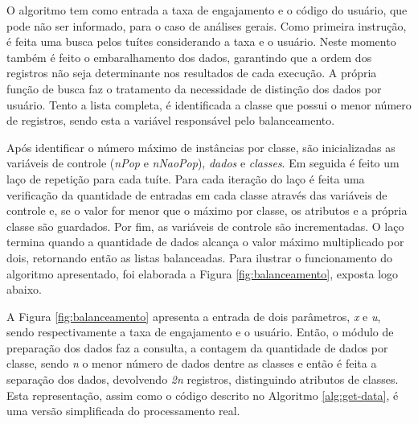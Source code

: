 \documentclass[oneside,openright,12pt]{ufsm_2015} %
\begin{document}
    \par O algoritmo tem como entrada a taxa de engajamento e o código do usuário, que pode não ser informado, para o caso de análises gerais. Como primeira instrução, é feita uma busca pelos tuítes considerando a taxa e o usuário. Neste momento também é feito o embaralhamento dos dados, garantindo que a ordem dos registros não seja determinante nos resultados de cada execução. A própria função de busca faz o tratamento da necessidade de distinção dos dados por usuário. Tento a lista completa, é identificada a classe que possui o menor número de registros, sendo esta a variável responsável pelo balanceamento. 
    
    \par Após identificar o número máximo de instâncias por classe, são inicializadas as variáveis de controle (\textit{nPop} e \textit{nNaoPop}), \textit{dados} e \textit{classes}. Em seguida é feito um laço de repetição para cada tuíte. Para cada iteração do laço é feita uma verificação da quantidade de entradas em cada classe através das variáveis de controle e, se o valor for menor que o máximo por classe, os atributos e a própria classe são guardados. Por fim, as variáveis de controle são incrementadas. O laço termina quando a quantidade de dados alcança o valor máximo multiplicado por dois, retornando então as listas balanceadas. Para ilustrar o funcionamento do algoritmo apresentado, foi elaborada a Figura \ref{fig:balanceamento}, exposta logo abaixo.
    
    \par A Figura \ref{fig:balanceamento} apresenta a entrada de dois parâmetros, \textit{x} e \textit{u}, sendo respectivamente a taxa de engajamento e o usuário. Então, o módulo de preparação dos dados faz a consulta, a contagem da quantidade de dados por classe, sendo \textit{n} o menor número de dados dentre as classes e então é feita a separação dos dados, devolvendo \textit{2n} registros, distinguindo atributos de classes. Esta representação, assim como o código descrito no Algoritmo \ref{alg:get-data}, é uma versão simplificada do processamento real. %
    
\end{document}
